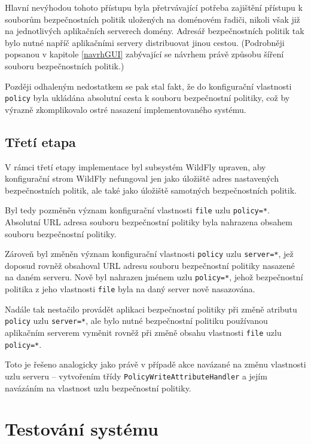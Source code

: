 Hlavní nevýhodou tohoto přístupu byla přetrvávající potřeba zajištění přístupu k souborům bezpečnostních politik uložených na doménovém řadiči, nikoli však již na jednotlivých aplikačních serverech domény. Adresář bezpečnostních politik tak bylo nutné napříč aplikačními servery distribuovat jinou cestou. (Podrobněji popsanou v kapitole \ref{navrhGUI} zabývající se návrhem právě způsobu šíření souboru bezpečnostních politik.)

Později odhaleným nedostatkem se pak stal fakt, že do konfigurační vlastnosti {\tt policy} byla ukládána absolutní cesta k souboru bezpečnostní politiky, což by výrazně zkomplikovalo ostré nasazení implementovaného systému.

\section{Třetí etapa}

V rámci třetí etapy implementace byl subsystém WildFly upraven, aby konfigurační strom WildFly nefungoval jen jako úložiště adres nastavených bezpečnostních politik, ale také jako úložiště samotných bezpečnostních politik.

Byl tedy pozměněn význam konfigurační vlastnosti {\tt file} uzlu {\tt policy=*}. Absolutní URL adresa souboru  bezpečnostní politiky byla nahrazena obsahem souboru bezpečnostní politiky.

Zároveň byl změněn význam konfigurační vlastnosti {\tt policy} uzlu {\tt server=*}, jež doposud rovněž obsahoval URL adresu souboru bezpečnostní politiky nasazené na daném serveru. Nově byl nahrazen jménem uzlu {\tt policy=*}, jehož bezpečnostní politika z jeho vlastnosti {\tt file} byla na daný server nově nasazována.

Nadále tak nestačilo provádět aplikaci bezpečnostní politiky při změně atributu {\tt policy} uzlu {\tt server=*}, ale bylo nutné bezpečnostní politiku používanou aplikačním serverem vyměnit rovněž při změně obsahu vlastnosti {\tt file} uzlu {\tt policy=*}.

Toto je řešeno analogicky jako právě v případě akce navázané na změnu vlastnosti uzlu serveru -- vytvořením třídy {\tt PolicyWriteAttributeHandler} a jejím navázáním na vlastnost uzlu bezpečnostní politiky.

\chapter{Testování systému}

